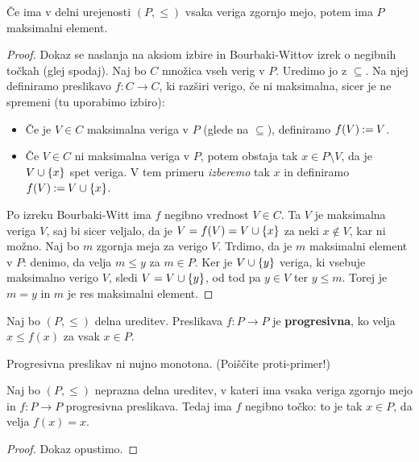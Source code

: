 \begin{lema}
  Če ima v delni urejenosti $(P, {\leq})$ vsaka veriga zgornjo mejo,
  potem ima $P$ maksimalni element.
\end{lema}

\begin{proof}
  Dokaz se naslanja na aksiom izbire in Bourbaki-Wittov izrek o negibnih točkah (glej
  spodaj). Naj bo $C$ množica vseh verig v $P$. Uredimo jo z $\subseteq$. Na njej definiramo preslikavo
  $f : C \to C$, ki razširi verigo, če ni maksimalna, sicer je ne spremeni (tu uporabimo
  izbiro):
  \begin{itemize}
  \item Če je $V \in C$ maksimalna veriga v $P$ (glede na $\subseteq$), definiramo $f(V) \mathbin{{:}{=}} V$.
  \item Če $V \in C$ ni maksimalna veriga v $P$, potem obstaja tak $x \in P \setminus V$, da je $V
    \cup \left\{x\right\}$ spet veriga. V tem primeru \emph{izberemo} tak $x$ in definiramo $f(V) \mathbin{{:}{=}} V
    \cup \left\{x\right\}$.
  \end{itemize}
  Po izreku Bourbaki-Witt ima $f$ negibno vrednost $V \in C$. Ta $V$ je maksimalna
  veriga $V$, saj bi sicer veljalo, da je $V = f(V) = V \cup \left\{x\right\}$ za neki $x \not\in V$,
  kar ni možno. Naj bo $m$ zgornja meja za verigo $V$. Trdimo, da je $m$
  maksimalni element v $P$: denimo, da velja $m \leq y$ za $m \in P$. Ker je $V \cup \left\{y\right\}$
  veriga, ki vsebuje maksimalno verigo $V$, sledi $V = V \cup \left\{y\right\}$, od tod pa $y \in V$
  ter $y \leq m$. Torej je $m = y$ in $m$ je res maksimalni element.
\end{proof}

\begin{definicija}
  Naj bo $(P, \leq)$ delna ureditev. Preslikava $f : P \to P$ je \textbf{progresivna}, ko
  velja $x \leq f(x)$ za vsak $x \in P$.
\end{definicija}

\begin{opomba}
  Progresivna preslikav ni nujno monotona. (Poiščite proti-primer!)
\end{opomba}

\begin{izrek}
  Naj bo $(P, {\leq})$ neprazna delna ureditev, v kateri ima vsaka veriga zgornjo mejo in $f : P \to P$ progresivna
  preslikava. Tedaj ima $f$ negibno točko: to je tak $x \in P$, da velja $f(x) = x$.
\end{izrek}

\begin{proof}
  Dokaz opustimo.
\end{proof}

